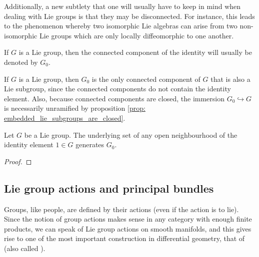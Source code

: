         Additionally, a new subtlety that one will usually have to keep in mind when dealing with Lie groups is that they may be disconnected. For instance, this leads to the phenomenon whereby two isomorphic Lie algebras can arise from two non-isomorphic Lie groups which are only locally diffeomorphic to one another.
        \begin{convention}
            If $G$ is a Lie group, then the connected component of the identity will usually be denoted by $G_0$.
        \end{convention}
        \begin{remark}
            If $G$ is a Lie group, then $G_0$ is the only connected component of $G$ that is also a Lie subgroup, since the connected components do not contain the identity element. Also, because connected components are closed, the immersion $G_0 \hookrightarrow G$ is necessarily unramified by proposition \ref{prop: embedded_lie_subgroups_are_closed}.
        \end{remark}
        \begin{lemma} \label{lemma: open_subgroups_of_the_identity_component}
            Let $G$ be a Lie group. The underlying set of any open neighbourhood of the identity element $1 \in G$ generates $G_0$.
        \end{lemma}
            \begin{proof}
                
            \end{proof}


    \subsection{Lie group actions and principal bundles}
        Groups, like people, are defined by their actions (even if the action is to lie). Since the notion of group actions makes sense in any category with enough finite products, we can speak of Lie group actions on smooth manifolds, and this gives rise to one of the most important construction in differential geometry, that of  (also called ).

        \begin{definition}[Equivariance] \label{def: equivariance}
            
        \end{definition}

